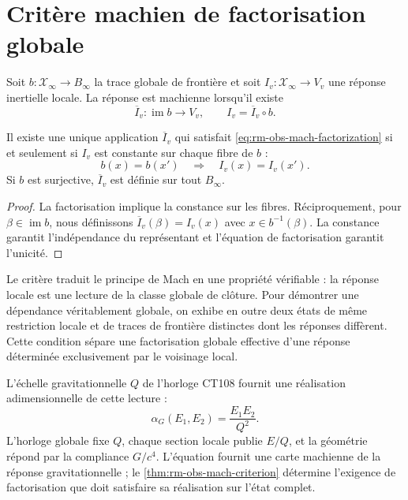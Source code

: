 \section{Critère machien de factorisation globale}

Soit \(b:\mathcal X_\infty\to B_\infty\) la trace globale de frontière et soit
\(I_v:\mathcal X_\infty\to V_v\) une réponse inertielle locale. La
réponse est machienne lorsqu'il existe
\begin{equation}
 \overline I_v:\operatorname{im}b\longrightarrow V_v,
 \qquad
 I_v=\overline I_v\circ b.
 \label{eq:rm-obs-mach-factorization}
\end{equation}

\begin{theorem}
\label{thm:rm-obs-mach-criterion}
Il existe une unique application \(\overline I_v\) qui satisfait
\cref{eq:rm-obs-mach-factorization} si et seulement si \(I_v\) est constante
sur chaque fibre de \(b\) :
\begin{equation}
 b(x)=b(x')\quad\Longrightarrow\quad I_v(x)=I_v(x').
 \label{eq:rm-obs-mach-fiber-criterion}
\end{equation}
Si \(b\) est surjective, \(\overline I_v\) est définie sur tout
\(B_\infty\).
\end{theorem}

\begin{proof}
La factorisation implique la constance sur les fibres. Réciproquement, pour
\(\beta\in\operatorname{im}b\), nous définissons
\(\overline I_v(\beta)=I_v(x)\) avec \(x\in b^{-1}(\beta)\). La constance
garantit l'indépendance du représentant et l'équation de factorisation
garantit l'unicité.
\end{proof}

Le critère traduit le principe de Mach en une propriété vérifiable : la
réponse locale est une lecture de la classe globale de clôture. Pour démontrer
une dépendance véritablement globale, on exhibe en outre deux états de même
restriction locale et de traces de frontière distinctes dont les réponses diffèrent.
Cette condition sépare une factorisation globale effective d'une réponse
déterminée exclusivement par le voisinage local.

L'échelle gravitationnelle \(Q\) de l'horloge CT108 fournit une réalisation
adimensionnelle de cette lecture :
\begin{equation}
 \alpha_G(E_1,E_2)=\frac{E_1E_2}{Q^2}.
 \label{eq:rm-obs-global-clock-coupling}
\end{equation}
L'horloge globale fixe \(Q\), chaque section locale publie \(E/Q\), et la
géométrie répond par la compliance \(G/c^4\). L'équation
fournit une carte machienne de la réponse gravitationnelle ; le
\cref{thm:rm-obs-mach-criterion} détermine l'exigence de factorisation
que doit satisfaire sa réalisation sur l'état complet.

